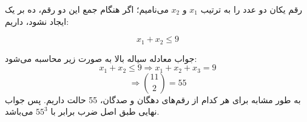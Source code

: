 \p
	رقم یکان دو عدد را به ترتیب 
	$x_1$
	و
	$x_2$
	می‌نامیم؛
	اگر هنگام جمع این دو رقم، ده بر یک ایجاد نشود، داریم:
	
	$$x_1 + x_2 \leq 9$$
	
	 جواب معادله سیاله بالا به صورت زیر محاسبه می‌شود:
	 $$x_1 + x_2 \leq 9 \Rightarrow x_1 + x_2 + x_3 = 9$$
	$$ \Rightarrow \binom{11}{2} = 55$$
    به طور مشابه 
	برای هر کدام از رقم‌های دهگان و صدگان، 55 حالت داریم. پس جواب نهایی طبق اصل ضرب برابر با
	$55^3$
	می‌باشد.